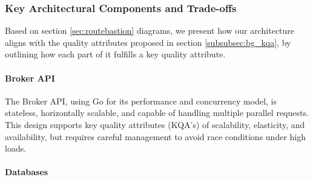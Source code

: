 \subsubsection{Key Architectural Components and Trade-offs}

Based on section \ref{sec:routebastion} diagrams, we present how our architecture aligns with the quality attributes proposed in section \ref{subsubsec:bg_kqa}, by outlining how each part of it fulfills a key quality attribute.

\paragraph{Broker API} 

The Broker API, using Go \cite{gopl} for its performance and concurrency model, is stateless, horizontally scalable, and capable of handling multiple parallel requests. This design supports key quality attributes (KQA's) of scalability, elasticity, and availability, but requires careful management to avoid race conditions under high loads.

\paragraph{Databases}


